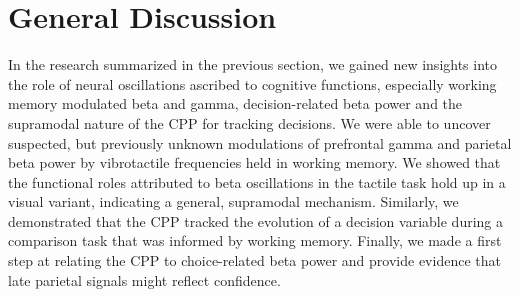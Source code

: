 
\chapter{General Discussion}

In the research summarized in the previous section, we gained new insights into the role of neural oscillations ascribed to cognitive functions, especially working memory modulated beta and gamma, decision-related beta power and the supramodal nature of the CPP for tracking decisions. We were able to uncover suspected, but previously unknown modulations of prefrontal gamma and parietal beta power by vibrotactile frequencies held in working memory. We showed that the functional roles attributed to beta oscillations in the tactile task hold up in a visual variant, indicating a general, supramodal mechanism. Similarly, we demonstrated that the CPP tracked the evolution of a decision variable during a comparison task that was informed by working memory. Finally, we made a first step at relating the CPP to choice-related beta power and provide evidence that late parietal signals might reflect confidence.



